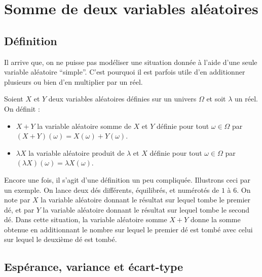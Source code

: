 


	
	\section{Somme de deux variables aléatoires}
	
	\subsection{Définition}
	
	Il arrive que, on ne puisse pas modéliser une situation donnée à l'aide d'une seule variable aléatoire ``simple''. C'est pourquoi il est parfois utile d'en additionner plusieurs ou bien d'en multiplier par un réel.
	
	\begin{formula}[Définition]
		Soient $X$ et $Y$ deux variables aléatoires définies sur un univers $\Omega$ et soit $\lambda$ un réel. On définit :
		\begin{itemize}
			\item $X + Y$ la variable aléatoire somme de $X$ et $Y$ définie pour tout $\omega \in \Omega$ par $(X + Y)(\omega) = X(\omega) + Y(\omega)$.
			\item $\lambda X$ la variable aléatoire produit de $\lambda$ et $X$ définie pour tout $\omega \in \Omega$ par $(\lambda X)(\omega) = \lambda X(\omega)$.
		\end{itemize}
	\end{formula}
	
	\begin{tip}[Exemple]
		Encore une fois, il s'agit d'une définition un peu compliquée. Illustrons ceci par un exemple.
		\newpar
		On lance deux dés différents, équilibrés, et numérotés de $1$ à $6$. On note par $X$ la variable aléatoire donnant le résultat sur lequel tombe le premier dé, et par $Y$ la variable aléatoire donnant le résultat sur lequel tombe le second dé.
		\newpar
		Dans cette situation, la variable aléatoire somme $X + Y$ donne la somme obtenue en additionnant le nombre sur lequel le premier dé est tombé avec celui sur lequel le deuxième dé est tombé.
	\end{tip}
	
	\subsection{Espérance, variance et écart-type}
	
